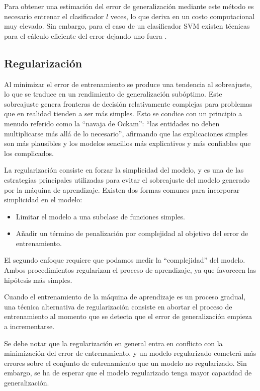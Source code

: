\documentclass[12pt,bibliography=oldstyle,DIV=12,parskip=half-]{scrreprt}
\begin{document}
Para obtener una estimación del error de generalización mediante este
método es necesario entrenar el clasificador $l$ veces, lo que deriva
en un costo computacional muy elevado. Sin embargo, para el caso de un
clasificador SVM existen técnicas para el cálculo eficiente del error
dejando uno fuera \cite{chapelle-vapnik, lee-keerthi}.
%
%
%
%
\subsection{Regularización}
%
Al minimizar el error de entrenamiento se produce una tendencia al
sobreajuste, lo que se traduce en un rendimiento de generalización
subóptimo. Este sobreajuste genera fronteras de decisión relativamente
complejas para problemas que en realidad tienden a ser más simples.
Esto se condice con un principio a menudo referido como la ``navaja de
Ockam'':
``las entidades no deben multiplicarse más allá de lo necesario'',
afirmando que las explicaciones simples son más plausibles y los
modelos sencillos más explicativos y más confiables que los
complicados.

La regularización consiste en forzar la simplicidad del modelo, y es
una de las estrategias principales utilizadas para evitar el
sobreajuste del modelo generado por la máquina de aprendizaje. Existen
dos formas comunes para incorporar simplicidad en el modelo:
%
\begin{itemize}
\item Limitar el modelo a una subclase de funciones simples.
\item Añadir un término de penalización por complejidad al objetivo
  del error de entrenamiento.
\end{itemize}
%
El segundo enfoque requiere que podamos medir la ``complejidad'' del
modelo. Ambos procedimientos regularizan el proceso de aprendizaje, ya
que favorecen las hipótesis más simples.

Cuando el entrenamiento de la máquina de aprendizaje es un proceso
gradual, una técnica alternativa de regularización consiste en
abortar el proceso de entrenamiento al momento que se detecta
que el error de generalización empieza a incrementarse.

Se debe notar que la regularización en general entra en conflicto con
la minimización del error de entrenamiento, y un modelo regularizado
cometerá más errores sobre el conjunto de entrenamiento que un modelo
no regularizado.  Sin embargo, se ha de esperar que el modelo
regularizado tenga mayor capacidad de generalización.
%
%
%
\end{document}
